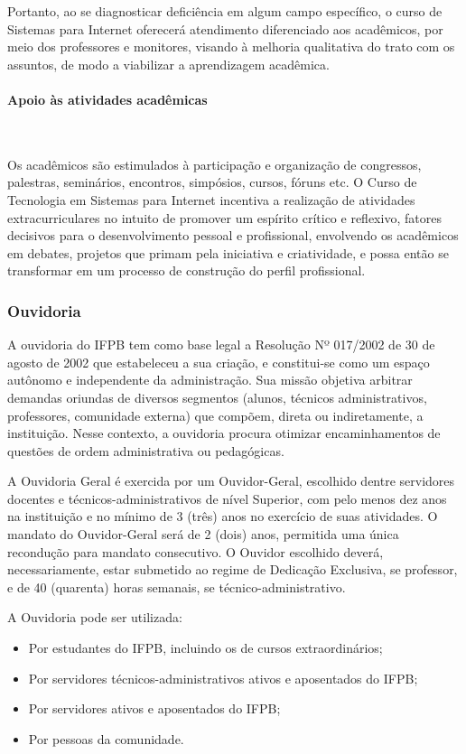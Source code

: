 	Portanto, ao se diagnosticar deficiência em algum campo específico, o curso de Sistemas para Internet oferecer\'a atendimento diferenciado aos acadêmicos, por meio dos professores e monitores, visando à melhoria qualitativa do trato com os assuntos, de modo a viabilizar a aprendizagem acadêmica.

\paragraph{Apoio \`as atividades acad\^emicas}\

Os acadêmicos são estimulados \`a participação e organização de congressos, palestras, seminários, encontros, simpósios, cursos, fóruns etc. O Curso de Tecnologia em Sistemas para Internet incentiva a realização de atividades extracurriculares no intuito de promover um espírito crítico e reflexivo, fatores decisivos para o desenvolvimento pessoal e profissional, envolvendo os acadêmicos em debates, projetos que primam pela iniciativa e criatividade, e possa então se transformar em um processo de construção do perfil profissional.

\subsubsection{Ouvidoria}
       
A ouvidoria do IFPB tem como base legal a Resolução Nº 017/2002 de 30 de agosto de 2002 que estabeleceu a sua criação, e constitui-se como um espaço autônomo e independente da administração.  Sua missão objetiva arbitrar demandas oriundas de diversos segmentos (alunos, técnicos administrativos, professores, comunidade externa) que compõem, direta ou indiretamente, a instituição. Nesse contexto, a ouvidoria procura otimizar encaminhamentos de questões de ordem administrativa ou pedagógicas. 

A Ouvidoria Geral é exercida por um Ouvidor-Geral, escolhido dentre servidores docentes e técnicos-administrativos de nível Superior, com pelo menos dez anos na instituição e no mínimo de 3 (três) anos no exercício de suas atividades. O mandato do Ouvidor-Geral será de 2 (dois) anos, permitida uma única recondução para mandato consecutivo. O Ouvidor escolhido deverá, necessariamente, estar submetido ao regime de Dedicação Exclusiva, se professor, e de 40 (quarenta) horas semanais, se técnico-administrativo.

                 A Ouvidoria pode ser utilizada:

\begin{itemize}
\item Por estudantes do IFPB, incluindo os de cursos extraordinários;

\item Por servidores técnicos-administrativos ativos e aposentados do IFPB;

\item Por servidores ativos e aposentados do IFPB;

\item Por pessoas da comunidade.
\end{itemize}

